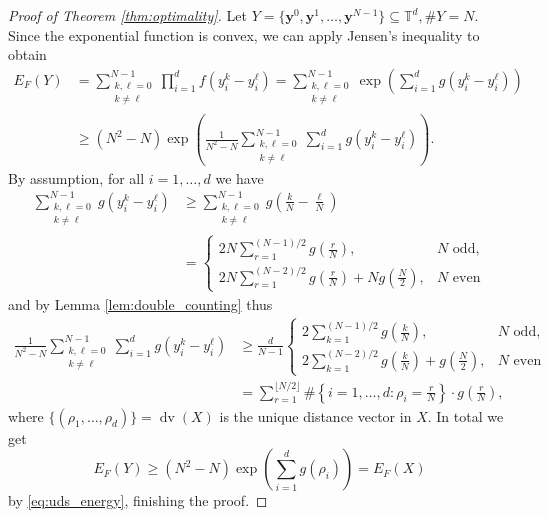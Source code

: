 \documentclass[a4paper,12pt]{article}
\numberwithin{equation}{section}
\theoremstyle{definition}
\newcommand{\by}{\mathbf{y}}
\newcommand{\bbT}{\mathbb{T}}
\newcommand{\sbse}{\subseteq}
\newcommand{\dv}{\operatorname{dv}}
\begin{document}

\begin{proof}[Proof of Theorem \ref{thm:optimality}]
    Let $Y = \{\by^0, \by^1, \dots, \by^{N-1}\} \sbse \bbT^d, \#Y = N$. Since the exponential function is convex, we can apply Jensen's inequality to obtain
    \begin{align*}
        E_F(Y) & = \sum_{\substack{k, \ell = 0 \\ k \neq \ell}}^{N-1} \prod_{i=1}^d f(y_i^k-y_i^\ell) = \sum_{\substack{k, \ell = 0 \\ k \neq \ell}}^{N-1} \exp\left(\sum_{i=1}^d g(y_i^k-y_i^\ell)\right) \\
        & \geq (N^2-N) \exp\left(\frac1{N^2-N} \sum_{\substack{k, \ell = 0 \\ k \neq \ell}}^{N-1} \sum_{i=1}^d g(y_i^k-y_i^\ell) \right).
    \end{align*}
    By assumption, for all $i=1, \dots, d$ we have
    \begin{align*}
        \sum_{\substack{k, \ell = 0 \\ k \neq \ell}}^{N-1} g(y_i^k-y_i^\ell) & \geq \sum_{\substack{k, \ell = 0 \\ k \neq \ell}}^{N-1} g\left(\frac kN - \frac \ell N\right) \\
    & = \begin{cases}
        2N \sum_{r=1}^{(N-1)/2} g\left(\frac rN\right), &  N \text{ odd}, \\
        2N \sum_{r=1}^{(N-2)/2} g\left(\frac rN\right) + Ng\left(\frac N2\right), &  N \text{ even}
    \end{cases}
    \end{align*}
    and by Lemma \ref{lem:double_counting} thus
    \begin{align*}
        \frac1{N^2-N} \sum_{\substack{k, \ell = 0 \\ k \neq \ell}}^{N-1} \sum_{i=1}^d g(y_i^k-y_i^\ell) & \geq \frac d{N-1} \begin{cases}
        2\sum_{k=1}^{(N-1)/2} g\left(\frac kN\right) ,&  N \text{ odd}, \\
        2\sum_{k=1}^{(N-2)/2} g\left(\frac kN\right) + g\left(\frac N2\right), &  N \text{ even}
    \end{cases} \\
    & = \sum_{r=1}^{\lfloor N/2 \rfloor} \#\left\{i=1, \dots, d: \rho_i = \frac rN\right\} \cdot g\left(\frac rN\right),
    \end{align*}
    where $\{(\rho_1, \dots, \rho_d)\} = \dv(X)$ is the unique distance vector in $X$. In total we get
    $$
    E_F(Y) \geq (N^2-N) \exp\left(\sum_{i=1}^d g(\rho_i)\right) = E_F(X)
    $$
    by \eqref{eq:uds_energy}, finishing the proof.
\end{proof}
\end{document}
